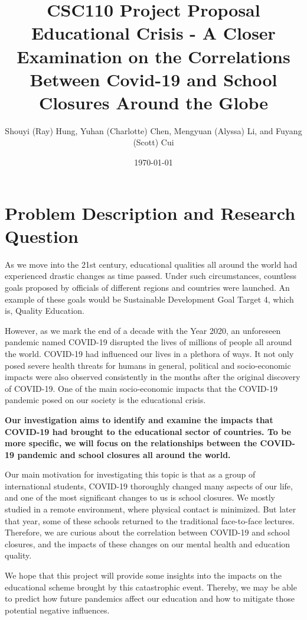 \documentclass[fontsize=11pt]{article}
\title{CSC110 Project Proposal\\ Educational Crisis - A Closer Examination on the Correlations Between Covid-19 and School Closures Around the Globe}
\author{Shouyi (Ray) Hung, Yuhan (Charlotte) Chen, Mengyuan (Alyssa) Li, and Fuyang (Scott) Cui}
\date{\today}
\begin{document}
\maketitle

\section*{Problem Description and Research Question}

As we move into the 21st century, educational qualities all around the world had experienced drastic changes as time passed. Under such circumstances, countless goals proposed by officials of different regions and countries were launched. An example of these goals would be Sustainable Development Goal Target 4, which is, Quality Education.

However, as we mark the end of a decade with the Year 2020, an unforeseen pandemic named COVID-19 disrupted the lives of millions of people all around the world. COVID-19 had influenced our lives in a plethora of ways. It not only posed severe health threats for humans in general, political and socio-economic impacts were also observed consistently in the months after the original discovery of COVID-19. One of the main socio-economic impacts that the COVID-19 pandemic posed on our society is the educational crisis.

\textbf{
    Our investigation aims to identify and examine the impacts that COVID-19 had brought to the educational sector of countries. To be more specific, we will focus on the relationships between the COVID-19 pandemic and school closures all around the world.
}

Our main motivation for investigating this topic is that as a group of international students, COVID-19 thoroughly changed many aspects of our life, and one of the most significant changes to us is school closures. We mostly studied in a remote environment, where physical contact is minimized. But later that year, some of these schools returned to the traditional face-to-face lectures. Therefore, we are curious about the correlation between COVID-19 and school closures, and the impacts of these changes on our mental health and education quality.

We hope that this project will provide some insights into the impacts on the educational scheme brought by this catastrophic event. Thereby, we may be able to predict how future pandemics affect our education and how to mitigate those potential negative influences.
\end{document}
